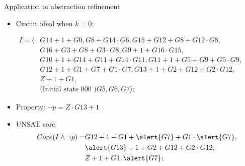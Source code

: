 \documentclass[xcolor=dvipsnames]{beamer}
\newcommand{\bi}{\begin{itemize}}
\newcommand{\ei}{\end{itemize}}
\begin{document}
\begin{frame}{\large{Application to abstraction refinement}}
\bi
\item Circuit ideal when $k=0$:
\ei
\begin{align*}
I = \langle & G14+1+G0, G8+G14\cdot G6, G15+G12+G8+G12\cdot G8,\\ 
	& G16+G3+G8+G3\cdot G8, G9+1+G16\cdot G15, \\ 
	& G10+1+G14+G11+G14\cdot G11, G11+1+G5+G9+G5\cdot G9, \\
	& G12+1+G1+G7+G1\cdot G7, G13+1+G2+G12+G2\cdot G12, \\
	& Z+1+G1, \\
	& \text{(Initial state 000 )} G5, G6, G7 \rangle;
\end{align*}
\vspace{-0.2in}
\bi
\item Property: $\neg p = Z\cdot G13 + 1$
\item UNSAT core: \begin{align*}
Core(I\land \neg p) =& G12+1+G1+\alert{G7}+G1\cdot \alert{G7},\\
&\alert{G13}+1+G2+G12+G2\cdot G12, \\
& Z+1+G1, \alert{G7};
\end{align*}
\ei
\end{frame}
\end{document}

